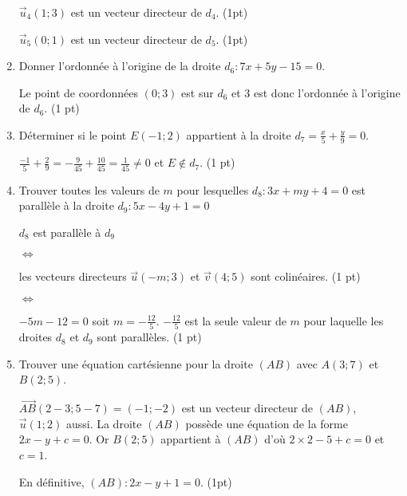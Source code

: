 \documentclass[a4paper,11pt]{article}
\theoremstyle{break}
\begin{document}
\begin{exo}
\begin{enumerate}
\begin{correction}
 $\vec{u}_4(1;3)$ est un vecteur directeur de $d_4$. (1pt) 
 
 $\vec{u}_5(0;1)$ est un vecteur directeur de $d_5$. (1pt)
\end{correction}
    
\item Donner l'ordonnée à l'origine de la droite $d_6:7x+5y-15=0$.
    
\begin{correction}
  Le point de coordonn\'ees $(0;3)$ est sur $d_6$ et $3$ est donc l'ordonn\'ee \`a 
  l'origine de $d_6$. (1 pt)
\end{correction}

  \item Déterminer si le point $E(-1;2)$ appartient à la droite 
  $d_7= \frac{x}{5}+\frac{y}{9}=0$. 
\begin{correction}
 $\frac{-1}{5}+\frac{2}{9}=-\frac{9}{45}+\frac{10}{45} = \frac{1}{45} \neq 0$ et $E \notin d_7$. (1 pt)
\end{correction}

    \item Trouver toutes les valeurs de $m$ pour lesquelles $d_8:3x+my+4=0$ est parall\`ele 
    à la droite $d_9:5x-4y+1=0$

\begin{correction}
 $d_8$ est parall\`ele \`a $d_9$ 
 
 $\Leftrightarrow$
 
 les vecteurs directeurs $\vec{u}(-m;3)$ et $\vec{v}(4;5)$ sont colin\'eaires. (1 pt)
 
 $\Leftrightarrow$
 
 $-5m-12=0$ soit $m=-\frac{12}{5}$. $-\frac{12}{5}$ est la seule valeur de $m$ pour laquelle 
 les droites $d_8$ et $d_9$ sont parall\`eles. (1 pt)
\end{correction}

\item Trouver une équation cartésienne pour la droite $(AB)$ avec $A(3;7)$ et $B(2;5)$.

\begin{correction}
 $\vec{AB}(2-3;5-7)=(-1;-2)$ est un vecteur directeur de $(AB)$, $\vec{u}(1;2)$ aussi. La droite $(AB)$ poss\`ede une \'equation
 de la forme $2x-y+c=0$. Or $B(2;5)$ appartient \`a $(AB)$ d'o\`u $2 \times 2-5+c=0$ et $c=1$. 
 
 En d\'efinitive, $(AB):2x-y+1=0$. (1pt)
\end{correction}


    \end{enumerate}
  \end{exo}
    
\end{document}

